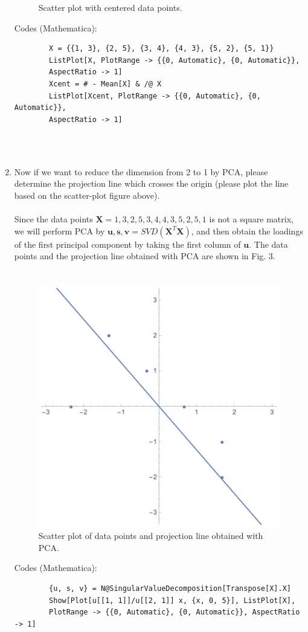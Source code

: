 \documentclass[11pt]{article}
\newcommand{\mtx}[1]{\mathbf{#1}}
\newcommand{\vct}[1]{\mathbf{#1}}
\def \mX {\mtx{X}}
\def \vu {\vct{u}}
\def \vv {\vct{v}}
\def \vs {\vct{s}}
\begin{document}
\begin{enumerate}
\begin{figure}[H]
		\caption{Scatter plot with centered data points.} %
		\label{fig:fig2}  %
	\end{figure}
	Codes (Mathematica):
	\begin{verbatim}
		X = {{1, 3}, {2, 5}, {3, 4}, {4, 3}, {5, 2}, {5, 1}}
		ListPlot[X, PlotRange -> {{0, Automatic}, {0, Automatic}}, 
		AspectRatio -> 1]
		Xcent = # - Mean[X] & /@ X
		ListPlot[Xcent, PlotRange -> {{0, Automatic}, {0, Automatic}}, 
		AspectRatio -> 1]
	\end{verbatim} \\ \\

	\item Now if we want to reduce the dimension from 2 to 1 by PCA, please determine the projection line which crosses the origin (please plot the line based on the scatter-plot figure above).\\ \\
	Since the data points $\mX={{1, 3}, {2, 5}, {3, 4}, {4, 3}, {5, 2}, {5, 1}}$ is not a square matrix, we will perform PCA by ${\vu, \vs, \vv}=SVD(\mX^T\mX)$, and then obtain the loadings of the first principal component by taking the first column of $\vu$. The data points and the projection line obtained with PCA are shown in Fig. 3.\\ \\
	\begin{figure}[H] %
		\centering\includegraphics[width=0.6\linewidth]{prob1_pca.png}
		\caption{Scatter plot of data points and projection line obtained with PCA.} %
		\label{fig:fig3}  %
	\end{figure}
	Codes (Mathematica):
	\begin{verbatim}
		{u, s, v} = N@SingularValueDecomposition[Transpose[X].X]
		Show[Plot[u[[1, 1]]/u[[2, 1]] x, {x, 0, 5}], ListPlot[X], 
		PlotRange -> {{0, Automatic}, {0, Automatic}}, AspectRatio -> 1]
	\end{verbatim} \\ \\
	

\end{enumerate}
\end{document}
